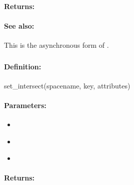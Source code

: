 \paragraph{Returns:}


\paragraph{See also:}  This is the asynchronous form of .

\pagebreak
\subsubsection{}
\label{api:ruby:set_intersect}


\paragraph{Definition:}
\begin{rubycode}
set_intersect(spacename, key, attributes)
\end{rubycode}

\paragraph{Parameters:}
\begin{itemize}[noitemsep]
\item {}\\

\item {}\\

\item {}\\

\end{itemize}

\paragraph{Returns:}


\pagebreak
\subsubsection{}
\label{api:ruby:async_set_intersect}


